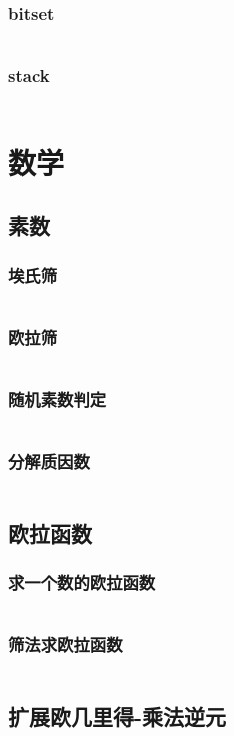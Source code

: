     \subsubsection{bitset}
      \inputminted{cpp}{src/2_STL和fastIO/3_容器/5_bitset.cpp}
    \subsubsection{stack}
      \inputminted{cpp}{src/2_STL和fastIO/3_容器/6_stack.cpp}
\section{数学}
  \subsection{素数}
    \subsubsection{埃氏筛}
      \inputminted{cpp}{src/3_数学/1_素数/1_埃氏筛.cpp}
    \subsubsection{欧拉筛}
      \inputminted{cpp}{src/3_数学/1_素数/2_欧拉筛.cpp}
    \subsubsection{随机素数判定}
      \inputminted{cpp}{src/3_数学/1_素数/3_随机素数判定.cpp}
    \subsubsection{分解质因数}
      \inputminted{cpp}{src/3_数学/1_素数/4_分解质因数.cpp}
  \subsection{欧拉函数}
    \subsubsection{求一个数的欧拉函数}
      \inputminted{cpp}{src/3_数学/2_欧拉函数/1_求一个数的欧拉函数.cpp}
    \subsubsection{筛法求欧拉函数}
      \inputminted{cpp}{src/3_数学/2_欧拉函数/2_筛法求欧拉函数.cpp}
  \subsection{扩展欧几里得-乘法逆元}
